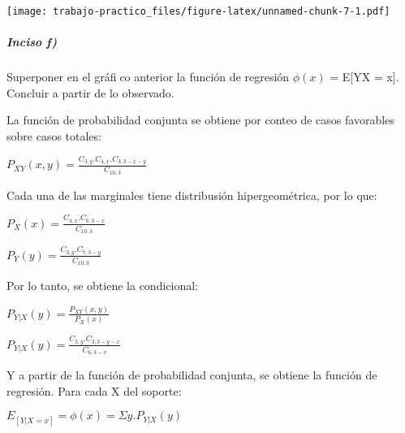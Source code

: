 \documentclass[
]{article}
\begin{document}
\texttt{[image: trabajo-practico\_files/figure-latex/unnamed-chunk-7-1.pdf]}

\hypertarget{inciso-f}{%
\subparagraph{Inciso f)}\label{inciso-f}}

Superponer en el gráfico anterior la función de regresión \(\phi(x)\) =
E{[}Y\textbar X = x{]}. Concluir a partir de lo observado.

La función de probabilidad conjunta se obtiene por conteo de casos
favorables sobre casos totales:

\(P_{XY}(x,y)= \frac{C_{3,y}.C_{4,x}.C_{3,3-x-y}}{C_{10,3}}\)

Cada una de las marginales tiene distribusión hipergeométrica, por lo
que:

\(P_{X}(x)= \frac{C_{4,x}.C_{6,3-x}}{C_{10,3}}\)

\(P_{Y}(y)= \frac{C_{3,y}.C_{7,3-y}}{C_{10,3}}\)

Por lo tanto, se obtiene la condicional:

\(P_{Y|X}(y)= \frac{P_{XY}(x,y)}{P_{X}(x)}\)

\(P_{Y|X}(y)= \frac{C_{3,y}.C_{3,3-y-x}}{C_{6,3-x}}\)

Y a partir de la función de probabilidad conjunta, se obtiene la función
de regresión. Para cada X del soporte:

\(E_{[Y|X=x]}=\phi(x)= \Sigma y.P_{Y|X}(y)\)
\end{document}
